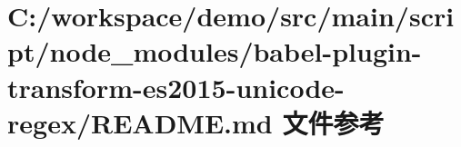 \hypertarget{node__modules_2babel-plugin-transform-es2015-unicode-regex_2_r_e_a_d_m_e_8md}{}\section{C\+:/workspace/demo/src/main/script/node\+\_\+modules/babel-\/plugin-\/transform-\/es2015-\/unicode-\/regex/\+R\+E\+A\+D\+ME.md 文件参考}
\label{node__modules_2babel-plugin-transform-es2015-unicode-regex_2_r_e_a_d_m_e_8md}
